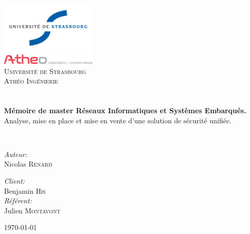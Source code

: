 \begin{titlepage}
\begin{center}

\includegraphics[width=0.35\textwidth]{../template-unistra/logo-uds}~\\[0.5cm]
\includegraphics[width=0.35\textwidth]{../template-unistra/logo_menu.png}~\\[1cm]

\textsc{\LARGE Université de Strasbourg} \\[0.5cm]
\textsc{\LARGE Athéo Ingénierie}\\[1.5cm]


\textsc{\Large }\\[0.5cm]

\HRule \\[0.4cm]

{\huge {\bfseries Mémoire de master Réseaux Informatiques et Systèmes Embarqués.}\\
Analyse, mise en place et mise en vente d'une solution de sécurité unifiée. \\[0.4cm] }

\HRule \\[1.5cm]

\begin{minipage}{0.4\textwidth}
\begin{flushleft} \large
\emph{Auteur:}\\
Nicolas \textsc{Renard}\\
\end{flushleft}
\end{minipage}
\begin{minipage}{0.4\textwidth}
\begin{flushright} \large
\emph{Client:} \\
Benjamin \textsc{His}\\
\emph{Référent:} \\
Julien \textsc{Montavont}
\end{flushright}
\end{minipage}

\vfill

{\large \today}

\end{center}
\end{titlepage}